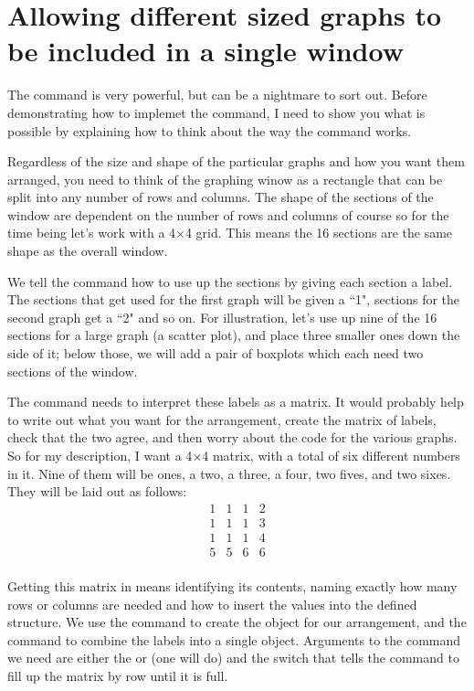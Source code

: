\section{Allowing different sized graphs to be included in a single window} 
 
The  command is very powerful, but can be a nightmare to sort out. Before demonstrating how to implemet the command, I need to show you what is possible by explaining how to think about the way the command works. 
 
Regardless of the size and shape of the particular graphs and how you want them arranged, you need to think of the graphing winow as a rectangle that can be split into any number of rows and columns. The shape of the sections of the window are dependent on the number of rows and columns of course so for the time being let's work with a 4$\times$4 grid. This means the 16 sections are the same shape as the overall window. 
 
We tell the  command how to use up the sections by giving each section a label. The sections that get used for the first graph will be given a ``1", sections for the second graph get a ``2" and so on. For illustration, let's use up nine of the 16 sections for a large graph (a scatter plot), and place three smaller ones down the side of it; below those, we will add a pair of boxplots which each need two sections of the window. 
 
The  command needs to interpret these labels as a matrix. It would probably help to write out what you want for the arrangement, create the matrix of labels, check that the two agree, and then worry about the code for the various graphs. So for my description, I want a 4$\times$4 matrix, with a total of six different numbers in it. Nine of them will be ones, a two, a three, a four, two fives, and two sixes. They will be laid out as follows: 
$$\begin{array}{cccc} 1&1&1&2\\ 1&1&1&3\\ 1&1&1&4\\ 5&5&6&6\\ \end{array}$$ 
 
Getting this matrix in \R{} means identifying its contents, naming exactly how many rows or columns are needed and how to insert the values into the defined structure. We use the  command to create the object for our arrangement, and the  command to combine the labels into a single object. Arguments to the  command we need are either the  or  (one will do) and the  switch that tells the  command to fill up the matrix by row until it is full. 

